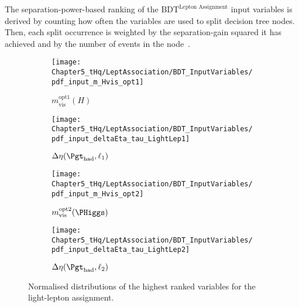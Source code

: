 The separation-power-based ranking of the $\text{BDT}^{\text{Lepton Assignment}}$ 
input variables is derived by counting how often the variables are used to 
split decision tree nodes. Then, each split occurrence is weighted by the separation-gain squared 
it has achieved and by the number of events in the node~\cite{Breiman1984ClassificationAR}.





\begin{figure}[h]
    \centering
    \begin{subfigure}[b]{0.42\textwidth}
        \centering
        \texttt{[image: Chapter5\_tHq/LeptAssociation/BDT\_InputVariables/pdf\_input\_m\_Hvis\_opt1]}
        \caption{$m^{\text{opt1}}_{\text{vis}}(H)$}
        \label{fig:ChaptH:LepAsign:SS:BDT:inputFeatuerRanked:m_H1}
    \end{subfigure}
    \hfill 
    \begin{subfigure}[b]{0.42\textwidth}
        \centering
        \texttt{[image: Chapter5\_tHq/LeptAssociation/BDT\_InputVariables/pdf\_input\_deltaEta\_tau\_LightLep1]}
        \caption{$\Delta \eta(\tauhad, \ell_{1})$}
        \label{fig:ChaptH:LepAsign:SS:BDT:inputFeatuerRanked:dEta1}
    \end{subfigure}
    
    \begin{subfigure}[b]{0.42\textwidth}
        \centering
        \texttt{[image: Chapter5\_tHq/LeptAssociation/BDT\_InputVariables/pdf\_input\_m\_Hvis\_opt2]}
        \caption{$m^{\text{opt2}}_{\text{vis}}(\PHiggs)$}
        \label{ffig:ChaptH:LepAsign:SS:BDT:inputFeatuerRanked:m_H2}
    \end{subfigure}
    \hfill
    \begin{subfigure}[b]{0.42\textwidth}
        \centering
        \texttt{[image: Chapter5\_tHq/LeptAssociation/BDT\_InputVariables/pdf\_input\_deltaEta\_tau\_LightLep2]}
        \caption{$\Delta \eta(\tauhad, \ell_{2})$}
        \label{fig:ChaptH:LepAsign:SS:BDT:inputFeatuerRanked:dEta2}
    \end{subfigure}
    \caption{Normalised distributions of the highest ranked variables for the light-lepton assignment.}
    \label{fig:ChaptH:LepAsign:SS:BDT:inputFeatuerRanked}
\end{figure}




